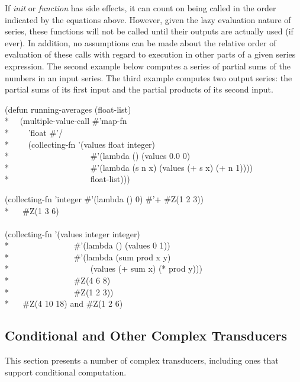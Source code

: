 \begin{defun}[Function]
If {\it init} or {\it function} has side effects, it can count on
being called in the order indicated by the equations above.  However,
given the lazy evaluation nature of series, these functions will not be called
until their outputs are actually used (if ever).  In addition, no
assumptions can be made about the relative order of evaluation of these
calls with regard to execution in other parts of a given series expression.
The second example below computes a series of partial sums of the numbers in
an input series.  The third example computes two output series: the
partial sums of its first input and the partial products of its second
input.
\begin{lisp}
(defun running-averages (float-list) \\*
~~(multiple-value-call \#'map-fn \\*
~~~~'float \#'/ \\*
~~~~(collecting-fn '(values float integer) \\*
~~~~~~~~~~~~~~~~~~~\#'(lambda () (values 0.0 0) \\*
~~~~~~~~~~~~~~~~~~~\#'(lambda (s n x) (values (+ s x) (+ n 1)))) \\*
~~~~~~~~~~~~~~~~~~~float-list)))
\end{lisp}
\begin{lisp}
(collecting-fn 'integer \#'(lambda () 0) \#'+ \#Z(1 2 3)) \\*
~~{\EV} \#Z(1 3 6) \\
\\
(collecting-fn '(values integer integer) \\*
~~~~~~~~~~~~~~~\#'(lambda () (values 0 1)) \\*
~~~~~~~~~~~~~~~\#'(lambda (sum prod x y) \\*
~~~~~~~~~~~~~~~~~~~(values (+ sum x) (* prod y))) \\*
~~~~~~~~~~~~~~~\#Z(4 6 8)  \\*
~~~~~~~~~~~~~~~\#Z(1 2 3)) \\*
~~{\EV} \#Z(4 10 18) {\rm and} \#Z(1 2 6)
\end{lisp}
\end{defun}

\subsection{Conditional and Other Complex Transducers}
\label{SERIES-OL-SECTION}

This section presents a number of complex transducers, including ones that
support conditional computation.


